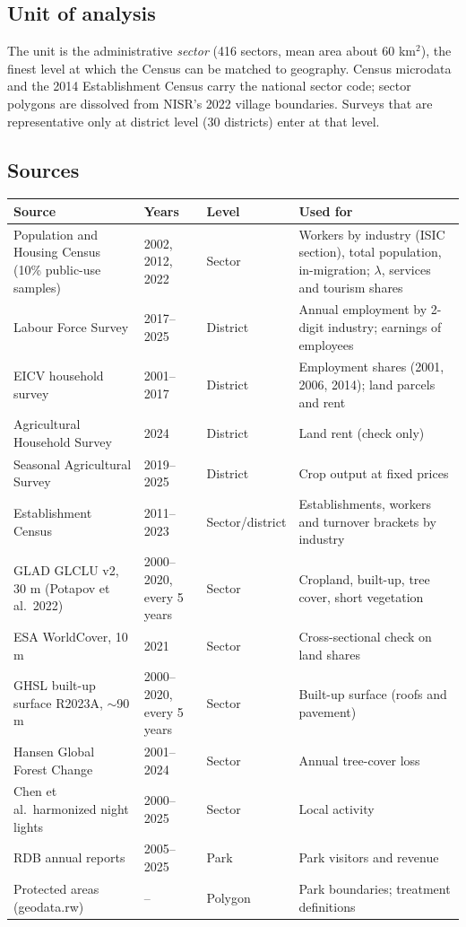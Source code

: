 \documentclass[11pt]{article}
\begin{document}
\subsection{Unit of analysis}
The unit is the administrative \emph{sector} (416 sectors, mean area about 60 km$^2$), the finest level at which the Census can be matched to geography. Census microdata and the 2014 Establishment Census carry the national sector code; sector polygons are dissolved from NISR's 2022 village boundaries. Surveys that are representative only at district level (30 districts) enter at that level.

\subsection{Sources}
\begin{table}[H]\centering\footnotesize
\begin{tabular}{p{3.5cm}p{2.4cm}p{1.6cm}p{6.4cm}}
\toprule
Source & Years & Level & Used for \\
\midrule
Population and Housing Census (10\% public-use samples) & 2002, 2012, 2022 & Sector & Workers by industry (ISIC section), total population, in-migration; $\lambda$, services and tourism shares \\
Labour Force Survey & 2017--2025 & District & Annual employment by 2-digit industry; earnings of employees \\
EICV household survey & 2001--2017 & District & Employment shares (2001, 2006, 2014); land parcels and rent \\
Agricultural Household Survey & 2024 & District & Land rent (check only) \\
Seasonal Agricultural Survey & 2019--2025 & District & Crop output at fixed prices \\
Establishment Census & 2011--2023 & Sector/\allowbreak district & Establishments, workers and turnover brackets by industry \\
GLAD GLCLU v2, 30 m (Potapov et al.\ 2022) & 2000--2020, every 5 years & Sector & Cropland, built-up, tree cover, short vegetation \\
ESA WorldCover, 10 m & 2021 & Sector & Cross-sectional check on land shares \\
GHSL built-up surface R2023A, $\sim$90 m & 2000--2020, every 5 years & Sector & Built-up surface (roofs and pavement) \\
Hansen Global Forest Change & 2001--2024 & Sector & Annual tree-cover loss \\
Chen et al.\ harmonized night lights & 2000--2025 & Sector & Local activity \\
RDB annual reports & 2005--2025 & Park & Park visitors and revenue \\
Protected areas (geodata.rw) & -- & Polygon & Park boundaries; treatment definitions \\
\bottomrule
\end{tabular}
\end{table}
\end{document}
